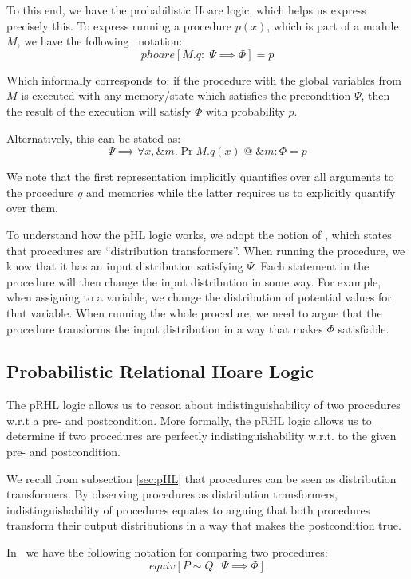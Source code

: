 To this end, we have the probabilistic Hoare logic, which helps us express precisely this.
To express running a procedure $p(x)$, which is part of a module $M$, we have the
following \easycrypt\ notation:
\[
  phoare[M.q :\; \Psi \implies \Phi] = p
\]

Which informally corresponds to: if the procedure with the global variables from $M$
is executed with any memory/state which satisfies the precondition $\Psi$, then the
result of the execution will satisfy $\Phi$ with probability $p$.

Alternatively, this can be stated as:
\begin{equation}
  \label{eq:proc_pr}
  \Psi \implies \forall x, \&m.\Pr{M.q(x) \; @ \; \&m : \Phi} = p
\end{equation}

We note that the first representation implicitly quantifies over all
arguments to the procedure $q$ and memories while the latter requires us to
explicitly quantify over them.

To understand how the pHL logic works, we adopt the notion of \cite{ec_intro},
which states that procedures are ``distribution transformers''.
When running the procedure, we know that it has an input distribution satisfying
$\Psi$. Each statement in the procedure will then change the input distribution
in some way. For example, when assigning to a variable, we change the
distribution of potential values for that variable. When running the whole
procedure, we need to argue that the procedure transforms the input distribution
in a way that makes $\Phi$ satisfiable.

\subsection{Probabilistic Relational Hoare Logic}
\label{sec:pRHL}
The pRHL logic allows us to reason about indistinguishability of two
procedures w.r.t a pre- and postcondition. More formally, the pRHL logic
allows us to determine if two procedures are perfectly indistinguishability w.r.t.
to the given pre- and postcondition.

We recall from subsection \ref{sec:pHL} that procedures can be seen as distribution
transformers. By observing procedures as distribution transformers,
indistinguishability of procedures equates to arguing that both procedures
transform their output distributions in a way that makes the postcondition
true.

In \easycrypt\ we have the following notation for comparing two procedures:
\[
  equiv[P \sim Q :\; \Psi \implies \Phi ]
\]

